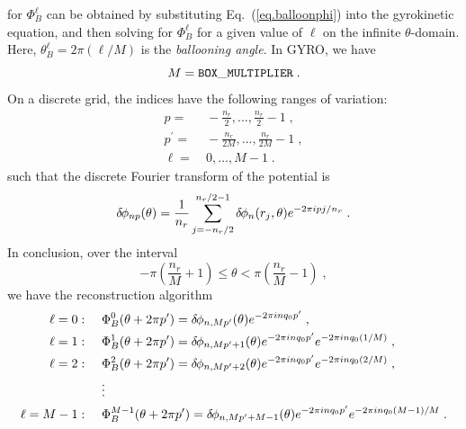 for $\Phi_B^\ell$ can be obtained by substituting Eq.~(\ref{eq.balloonphi}) 
into the gyrokinetic equation, and then solving for $\Phi_B^\ell$ for 
a given value of $\ell$ on the infinite $\theta$-domain.  Here, 
$\theta_B^\ell = 2\pi (\ell/M)$ is the {\it ballooning angle}.
In GYRO, we have
%
\begin{equation}
M = {\tt BOX\_MULTIPLIER} \; .
\end{equation}
%
On a discrete grid, the indices have the following ranges of variation:
%
\begin{align}
p = &~-\frac{n_r}{2} , \ldots, \frac{n_r}{2}-1 \; , \\
p^\prime = &~-\frac{n_r}{2M} , \ldots, \frac{n_r}{2M}-1 \; , \\
\ell = &~0, \ldots, M-1 \; .
\end{align}
%
such that the discrete Fourier transform of the potential is
%
\begin{equation}
\delta \hskip -1pt \phi_{np}(\theta) = \frac{1}{n_r} \sum_{j=-n_r/2}^{n_r/2-1} 
\delta \hskip -1pt \phi_n(r_j,\theta) e^{-2\pi i p j/n_r} \; .
\end{equation}
%
In conclusion, over the interval
%
\begin{equation}
-\pi \left( \frac{n_r}{M} + 1  \right) \le \theta <
\pi \left( \frac{n_r}{M} -1 \right) \; ,
\end{equation}
%
we have the reconstruction algorithm
%
\begin{align}
\ell = 0 : \quad &~\Phi_B^{0}(\theta+2\pi p^\prime) = 
\delta \hskip -1pt \phi_{n,Mp^\prime}(\theta) e^{-2\pi i n q_0 p^\prime} \; , \\
\ell = 1 : \quad &~\Phi_B^{1}(\theta+2\pi p^\prime) = 
 \delta \hskip -1pt \phi_{n,Mp^\prime+1}(\theta) e^{-2\pi i n q_0 p^\prime} 
 e^{-2\pi i n q_0 (1/M)} \; , \\
\ell = 2 : \quad &~\Phi_B^{2}(\theta+2\pi p^\prime) = 
\delta \hskip -1pt \phi_{n,Mp^\prime+2}(\theta) e^{-2\pi i n q_0 p^\prime} 
 e^{-2\pi i n q_0 (2/M)} \; , \\
 &~\vdots \\
\ell = M-1 : \quad &~\Phi_B^{M-1}(\theta+2\pi p^\prime) = 
\delta \hskip -1pt \phi_{n,Mp^\prime+M-1}(\theta) e^{-2\pi i n q_0 p^\prime} 
 e^{-2\pi i n q_0 (M-1)/M} \; .
\end{align} 
